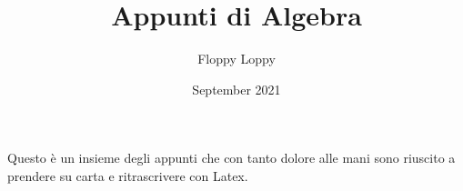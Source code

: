\documentclass[12pt, letterpaper, twoside]{article}
\title{Appunti di Algebra}
\author{Floppy Loppy}
\date{September 2021}
\begin{document}
\maketitle
Questo è un insieme degli appunti che con tanto dolore alle mani sono riuscito a prendere su carta e ritrascrivere con Latex.
\end{document}

